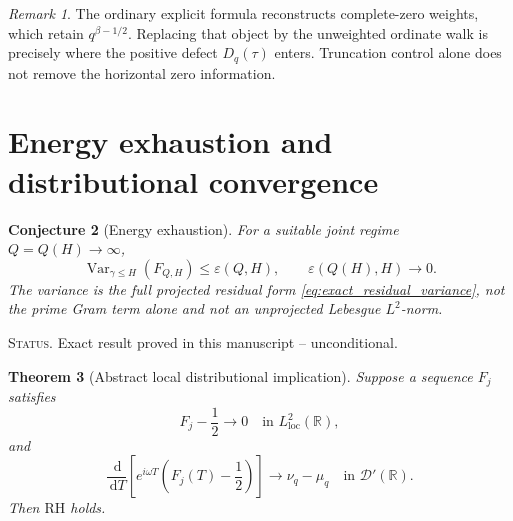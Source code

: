 \documentclass[11pt]{amsart}
\numberwithin{equation}{section}
\theoremstyle{plain}
\newtheorem{theorem}{Theorem}[section]
\newtheorem{conjecture}[theorem]{Conjecture}
\theoremstyle{definition}
\theoremstyle{remark}
\newtheorem{remark}[theorem]{Remark}
\DeclareMathOperator{\Var}{Var}
\newcommand{\RH}{\mathrm{RH}}
\newcommand{\1}{\mathbf{1}}
\newcommand{\dd}{\,\mathrm{d}}
\newcommand{\statusnote}[1]{%
  \par\smallskip\noindent
  \begingroup\footnotesize\textsc{Status.} #1\endgroup
  \par\smallskip}
\begin{document}
\begin{remark}
\label{rem:uniform_bridge_is_RH_interface}
The ordinary explicit formula reconstructs complete-zero weights, which
retain \(q^{\beta-1/2}\).  Replacing that object by the unweighted
ordinate walk is precisely where the positive defect
\(D_q(\tau)\) enters.  Truncation control alone does not remove the
horizontal zero information.
\end{remark}

\section{Energy exhaustion and distributional convergence}
\label{sec:two_main_lemmas}

\begin{conjecture}[Energy exhaustion]
\label{conj:energy_exhaustion}
For a suitable joint regime \(Q=Q(H)\to\infty\),
\begin{equation}
\Var_{\gamma\leq H}(F_{Q,H})
\leq
\varepsilon(Q,H),
\qquad
\varepsilon(Q(H),H)\to0.
\label{eq:energy_exhaustion}
\end{equation}
The variance is the full projected residual form
\eqref{eq:exact_residual_variance}, not the prime Gram term alone and not
an unprojected Lebesgue \(L^2\)-norm.
\end{conjecture}

\statusnote{Exact result proved in this manuscript -- unconditional.}
\begin{theorem}[Abstract local distributional implication]
\label{thm:distributional_implication}
Suppose a sequence \(F_j\) satisfies
\begin{equation}
F_j-\frac12\longrightarrow0
\quad\text{in }L^2_{\mathrm{loc}}(\mathbb R),
\label{eq:local_L2_convergence}
\end{equation}
and
\begin{equation}
\frac{\dd}{\dd T}
\left[
e^{i\omega T}
\left(F_j(T)-\frac12\right)
\right]
\longrightarrow
\nu_q-\mu_q
\quad\text{in }\mathcal D'(\mathbb R).
\label{eq:derivative_distributional_identification}
\end{equation}
Then \(\RH\) holds.
\end{theorem}
\end{document}
